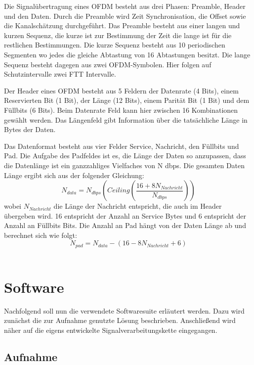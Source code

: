 Die Signalübertragung eines OFDM besteht aus drei Phasen: Preamble, Header und den Daten. Durch die Preamble wird Zeit Synchronisation, die Offset sowie die Kanalschätzung durchgeführt. Das Preamble besteht aus einer langen und kurzen Sequenz, die kurze ist zur Bestimmung der Zeit die lange ist für die restlichen Bestimmungen. Die kurze Sequenz besteht aus 10 periodischen Segmenten wo jedes die gleiche Abtastung von 16 Abtastungen besitzt. Die lange Sequenz besteht dagegen aus zwei OFDM-Symbolen. Hier folgen auf Schutzintervalle zwei FTT Intervalle.

Der Header eines OFDM besteht aus 5 Feldern der Datenrate (4 Bits), einem Reservierten Bit (1 Bit), der Länge (12 Bits), einem Parität Bit (1 Bit) und dem Füllbits (6 Bits). Beim Datenrate Feld kann hier zwischen 16 Kombinationen gewählt werden. Das Längenfeld gibt Information über die tatsächliche Länge in Bytes der Daten.

Das Datenformat besteht aus vier Felder Service, Nachricht, den Füllbits und Pad. Die Aufgabe des Padfeldes ist es, die Länge der Daten so anzupassen, dass die Datenlänge ist ein ganzzahliges Vielfaches von N dbps. Die gesamten Daten Länge ergibt sich aus der folgender Gleichung:
\begin{equation}
    N_{data}=N_{dbps}(Ceiling(\frac{16+8N_{Nachricht}}{N_{dbps}}))
\end{equation}
wobei $N_{Nachricht}$ die Länge der Nachricht entspricht, die auch im Header übergeben wird. 16 entspricht der Anzahl an Service Bytes und 6 entspricht der Anzahl an Füllbits Bits. Die Anzahl an Pad hängt von der Daten Länge ab und berechnet sich wie folgt:
\begin{equation}
    N_{pad}=N_{data}-(16-8N_{Nachricht}+6)
\end{equation}
~\cite[S.49ff]{Liu2019}

\section{Software}\label{sct:software}

Nachfolgend soll nun die verwendete Softwaresuite erläutert werden. Dazu wird zunächst die zur Aufnahme genutzte Lösung beschrieben. Anschließend wird näher auf die eigens entwickelte Signalverarbeitungskette eingegangen.

\subsection{Aufnahme}

